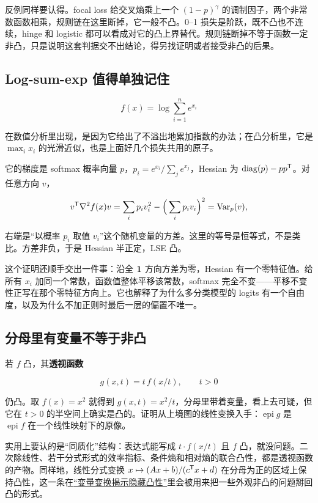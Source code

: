 反例同样要认得。focal loss 给交叉熵乘上一个 \((1-p)^\gamma\) 的调制因子，两个非常数函数相乘，规则链在这里断掉，它一般不凸。0--1 损失是阶跃，既不凸也不连续，hinge 和 logistic 都可以看成对它的凸上界替代。规则链断掉不等于函数一定非凸，只是说明这套判据交不出结论，得另找证明或者接受非凸的后果。

\subsection{Log-sum-exp 值得单独记住}

\[
f(x)=\log\sum_{i=1}^ne^{x_i}
\]

在数值分析里出现，是因为它给出了不溢出地累加指数的办法；在凸分析里，它是 \(\max_i x_i\) 的光滑近似，也是上面好几个损失共用的原子。

它的梯度是 softmax 概率向量 \(p\)，\(p_i=e^{x_i}/\sum_je^{x_j}\)，Hessian 为 \(\operatorname{diag}(p)-pp^{\mathsf{T}}\)。对任意方向 \(v\)，

\[
v^{\mathsf{T}}\nabla^2f(x)v=\sum_ip_iv_i^2-\Big(\sum_ip_iv_i\Big)^2=\operatorname{Var}_p(v),
\]

右端是``以概率 \(p_i\) 取值 \(v_i\)''这个随机变量的方差。这里的等号是恒等式，不是类比。方差非负，于是 Hessian 半正定，LSE 凸。

这个证明还顺手交出一件事：沿全 \(\mathbf{1}\) 方向方差为零，Hessian 有一个零特征值。给所有 \(x_i\) 加同一个常数，函数值整体平移该常数，softmax 完全不变——平移不变性正写在那个零特征方向上。它也解释了为什么多分类模型的 logits 有一个自由度，以及为什么不加正则时最后一层的偏置不唯一。

\subsection{分母里有变量不等于非凸}

若 \(f\) 凸，其\textbf{透视函数}

\[
g(x,t)=t\,f(x/t),\qquad t>0
\]

仍凸。取 \(f(x)=x^2\) 就得到 \(g(x,t)=x^2/t\)，分母里带着变量，看上去可疑，但它在 \(t>0\) 的半空间上确实是凸的。证明从上境图的线性变换入手：\(\operatorname{epi}g\) 是 \(\operatorname{epi}f\) 在一个线性映射下的原像。

实用上要认的是``同质化''结构：表达式能写成 \(t\cdot f(x/t)\) 且 \(f\) 凸，就没问题。二次除线性、若干分式形式的效率指标、条件熵和相对熵的联合凸性，都是透视函数的产物。同样地，线性分式变换 \(x\mapsto(Ax+b)/(c^{\mathsf{T}}x+d)\) 在分母为正的区域上保持凸性，这一条在\hyperref[sec:09-Convex-Optimization/04-Convex-Problems/03]{``变量变换揭示隐藏凸性''}里会被用来把一些外观非凸的问题掰回凸的形式。

